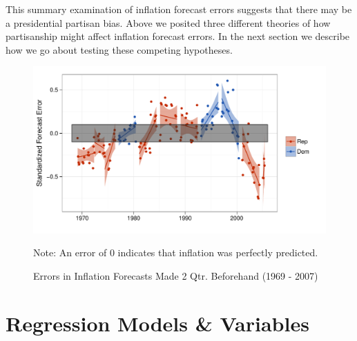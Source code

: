 \documentclass[a4paper]{article}
\begin{document}
This summary examination of inflation forecast errors suggests that there may be a presidential partisan bias. Above we posited three different theories of how partisanship might affect inflation forecast errors. In the next section we describe how we go about testing these competing hypotheses.

\begin{figure}[t]
    \caption{Errors in Inflation Forecasts Made 2 Qtr. Beforehand (1969 - 2007)}
    \label{errors_over_time}
    \begin{center}
    
\begin{knitrout}
\color{fgcolor}

{\centering \includegraphics[width=0.8\linewidth]{figure/PartisanError} 

}



\end{knitrout}

    
    \end{center}
    \begin{singlespace}
        {\scriptsize{Note: An error of 0 indicates that inflation was perfectly predicted.}}
    \end{singlespace}
\end{figure}




\section{Regression Models \& Variables}
\end{document}
